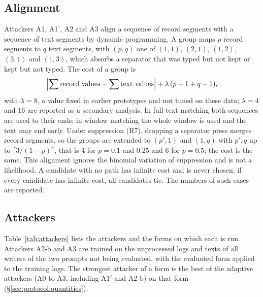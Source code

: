 \subsection{Alignment}
\label{sec:attackers:alignment}

Attackers A1, A1', A2 and A3 align a sequence of record segments with a sequence of text segments by dynamic
programming. A group maps $p$ record segments to $q$ text segments, with $(p, q)$ one of $(1,1)$, $(2,1)$, $(1,2)$,
$(3,1)$ and $(1,3)$, which absorbs a separator that was typed but not kept or kept but not typed. The cost of a group
is
\[
  \Bigl|\sum \text{record values} - \sum \text{text values}\Bigr| + \lambda\,(p - 1 + q - 1),
\]
with $\lambda = 8$, a value fixed in earlier prototypes and not tuned on these data; $\lambda = 4$ and $16$ are reported
as a secondary analysis. In full-text matching both
sequences are used to their ends; in window matching the whole window is used and the text may end early. Under
suppression (R7), dropping a separator press merges record segments, so the groups are extended to $(p', 1)$ and
$(1, q)$ with $p', q$ up to $\lceil 3/(1-p) \rceil$, that is 4 for $p = 0.1$ and $0.25$ and 6 for $p = 0.5$; the
cost is the same. This alignment ignores the binomial variation of suppression and is not a likelihood. A candidate
with no path has infinite cost and is never chosen; if every candidate has infinite cost, all candidates tie. The
numbers of such cases are reported.

\subsection{Attackers}
\label{sec:attackers:list}

Table~\ref{tab:attackers} lists the attackers and the forms on which each is run. Attackers A2-b and A3 are trained on
the unprocessed logs and texts of all writers of the two prompts not being evaluated, with the evaluated form applied to
the training logs. The strongest attacker of a form is the best of the adaptive attackers (A0 to A3, including A1$'$ and A2-b) on that
form
(\S\ref{sec:protocol:quantities}).

